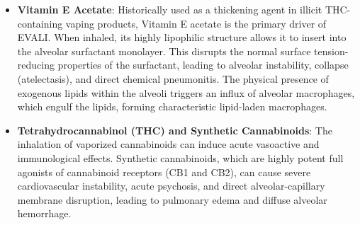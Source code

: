 \begin{itemize}
    \item \textbf{Vitamin E Acetate}: Historically used as a thickening agent in illicit THC-containing vaping products, Vitamin E acetate is the primary driver of EVALI. When inhaled, its highly lipophilic structure allows it to insert into the alveolar surfactant monolayer. This disrupts the normal surface tension-reducing properties of the surfactant, leading to alveolar instability, collapse (atelectasis), and direct chemical pneumonitis. The physical presence of exogenous lipids within the alveoli triggers an influx of alveolar macrophages, which engulf the lipids, forming characteristic lipid-laden macrophages.
    \item \textbf{Tetrahydrocannabinol (THC) and Synthetic Cannabinoids}: The inhalation of vaporized cannabinoids can induce acute vasoactive and immunological effects. Synthetic cannabinoids, which are highly potent full agonists of cannabinoid receptors (CB1 and CB2), can cause severe cardiovascular instability, acute psychosis, and direct alveolar-capillary membrane disruption, leading to pulmonary edema and diffuse alveolar hemorrhage.
\end{itemize}

